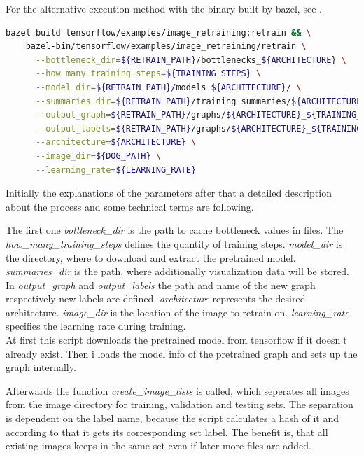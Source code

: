 For the alternative execution method with the binary built by bazel, see .

\begin{minipage}{\linewidth}
\begin{lstlisting}[caption=Build and call of \textit{retrain}, label=list:bretrain, language=bash]
	bazel build tensorflow/examples/image_retraining:retrain && \
	bazel-bin/tensorflow/examples/image_retraining/retrain \
	  --bottleneck_dir=${RETRAIN_PATH}/bottlenecks_${ARCHITECTURE} \
	  --how_many_training_steps=${TRAINING_STEPS} \
	  --model_dir=${RETRAIN_PATH}/models_${ARCHITECTURE}/ \
	  --summaries_dir=${RETRAIN_PATH}/training_summaries/${ARCHITECTURE}_${TRAINING_STEPS}/${ARCHITECTURE}_${TRAINING_STEPS}_${LEARNING_RATE} \
	  --output_graph=${RETRAIN_PATH}/graphs/${ARCHITECTURE}_${TRAINING_STEPS}/retrained_dog_graph_${ARCHITECTURE}_${TRAINING_STEPS}_${LEARNING_RATE}.pb \
	  --output_labels=${RETRAIN_PATH}/graphs/${ARCHITECTURE}_${TRAINING_STEPS}/retrained_dog_labels_${ARCHITECTURE}_${TRAINING_STEPS}_${LEARNING_RATE}.txt \
	  --architecture=${ARCHITECTURE} \
	  --image_dir=${DOG_PATH} \
	  --learning_rate=${LEARNING_RATE}
\end{lstlisting}
\end{minipage}

Initially the explanations of the parameters after that a detailed description about the process and some technical terms are following.

The first one \textit{bottleneck_dir} is the path to cache bottleneck values in files. The \textit{how_many_training_steps} defines the quantity of training steps. \textit{model_dir} is the directory, where to download and extract the pretrained model. \textit{summaries_dir} is the path, where additionally visualization data will be stored. In \textit{output_graph} and \textit{output_labels} the path and name of the new graph respectively new labels are defined. \textit{architecture} represents the desired architecture. \textit{image_dir} is the location of the image to retrain on. \textit{learning_rate} specifies the learning rate during training. \\


At first this script downloads the pretrained model from tensorflow if it doesn't already exist. Then i loads the model info of the pretrained graph and sets up the graph internally.

Afterwards the function \textit{create_image_lists} is called, which seperates all images from the image directory for training, validation and testing sets. The separation is dependent on the label name, because the script calculates a hash of it and according to that it gets its corresponding set label. The benefit is, that all existing images keeps in the same set even if later more files are added. \\


